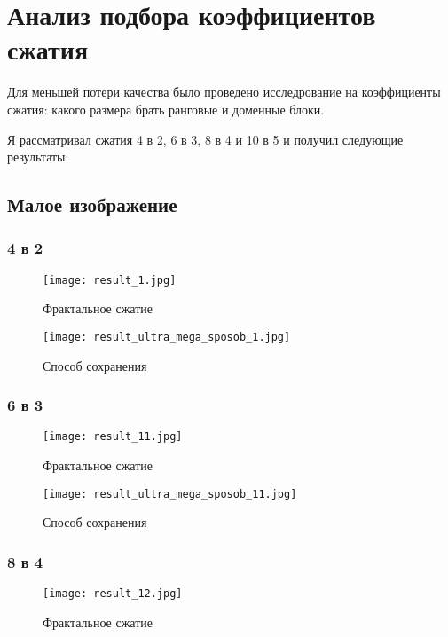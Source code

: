 \documentclass{article}
\begin{document}
\section{Анализ подбора коэффициентов сжатия}

Для меньшей потери качества было проведено исследрование на коэффициенты сжатия: какого размера брать ранговые и доменные блоки.

Я рассматривал сжатия 4 в 2, 6 в 3, 8 в 4 и 10 в 5 и получил следующие результаты:

\subsection{Малое изображение}
\subsubsection{4 в 2}
\begin{figure}[h]
	\centering
	\texttt{[image: result\_1.jpg]}
	\caption{Фрактальное сжатие}
	\label{fig:mpr}
\end{figure}

\begin{figure}[h]
	\centering
	\texttt{[image: result\_ultra\_mega\_sposob\_1.jpg]}
	\caption{Способ сохранения}
	\label{fig:mpr}
\end{figure}

\subsubsection{6 в 3}
\begin{figure}[h]
	\centering
	\texttt{[image: result\_11.jpg]}
	\caption{Фрактальное сжатие}
	\label{fig:mpr}
\end{figure}

\begin{figure}[h]
	\centering
	\texttt{[image: result\_ultra\_mega\_sposob\_11.jpg]}
	\caption{Способ сохранения}
	\label{fig:mpr}
\end{figure}

\subsubsection{8 в 4}
\begin{figure}[h]
	\centering
	\texttt{[image: result\_12.jpg]}
	\caption{Фрактальное сжатие}
	\label{fig:mpr}
\end{figure}
\end{document}
